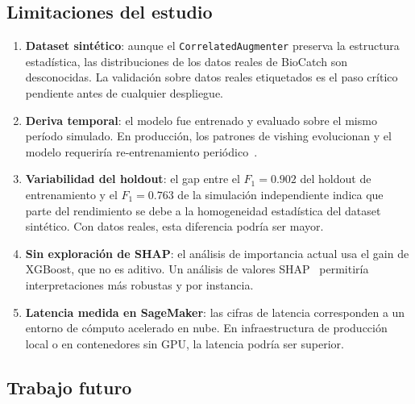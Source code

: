 \documentclass[journal]{IEEEtran}
\newcommand{\augcls}{\texttt{CorrelatedAugmenter}}
\begin{document}
\subsection{Limitaciones del estudio}

\begin{enumerate}
    \item \textbf{Dataset sintético}: aunque el \augcls{} preserva la
    estructura estadística, las distribuciones de los datos reales de BioCatch
    son desconocidas. La validación sobre datos reales etiquetados es el paso
    crítico pendiente antes de cualquier despliegue.

    \item \textbf{Deriva temporal}: el modelo fue entrenado y evaluado sobre
    el mismo período simulado. En producción, los patrones de vishing evolucionan
    y el modelo requeriría re-entrenamiento periódico~\cite{lu2020concept}.

    \item \textbf{Variabilidad del holdout}: el gap entre el $F_1=0.902$
    del holdout de entrenamiento y el $F_1=0.763$ de la simulación
    independiente indica que parte del rendimiento se debe a la homogeneidad
    estadística del dataset sintético. Con datos reales, esta diferencia
    podría ser mayor.

    \item \textbf{Sin exploración de SHAP}: el análisis de importancia actual
    usa el gain de XGBoost, que no es aditivo. Un análisis de valores
    SHAP~\cite{lundberg2017shap} permitiría interpretaciones más robustas y
    por instancia.

    \item \textbf{Latencia medida en SageMaker}: las cifras de latencia
    corresponden a un entorno de cómputo acelerado en nube. En infraestructura
    de producción local o en contenedores sin GPU, la latencia podría ser
    superior.
\end{enumerate}

\subsection{Trabajo futuro}
\end{document}
